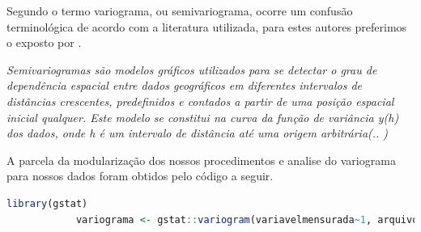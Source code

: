 		\hspace*{1.25 cm}  Segundo \cite[P.35]{Yamamoto} o termo variograma, ou semivariograma, ocorre um confusão terminológica de acordo com a literatura utilizada, para estes autores preferimos o exposto por \cite[p.228]{Ferreira}.  \begin{quoting}[rightmargin=0cm,leftmargin=2cm]
			\begin{singlespace}
				{
					\textit{Semivariogramas são modelos gráficos utilizados para se detectar o grau de dependência espacial entre dados geográficos em diferentes intervalos de distâncias crescentes, predefinidos e contados a partir de uma posição espacial inicial qualquer. Este modelo se constitui na curva da função de variância y(h) dos dados, onde h é um intervalo de distância até uma origem arbitrária(.. )}
				}
			\end{singlespace}
		\end{quoting}
		\hspace*{1.25 cm} A  parcela da modularização dos nossos procedimentos e analise do variograma para nossos dados foram obtidos pelo código a seguir.  
		\lstset{
			language=R, %
			caption= Producao do variogramas em linguagem R,} %
		\begin{lstlisting}[language=R]
			library(gstat)
			variograma <- gstat::variogram(variavelmensurada~1, arquivodogrid)
		\end{lstlisting}  
		

